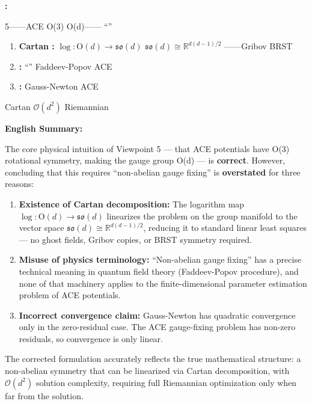 \documentclass[11pt,a4paper]{article}
\theoremstyle{plain}
\theoremstyle{definition}
\theoremstyle{remark}
\newcommand{\R}{\mathbb{R}}
\newcommand{\so}{\mathfrak{so}}
\begin{document}
\noindent
\textbf{:}

5——ACE  O(3)  O(d)——\textbf{}
``''\textbf{}

\begin{enumerate}[label=(\arabic*)]
  \item \textbf{Cartan :}  $\log: \mathrm{O}(d) \to \so(d)$
         $\so(d) \cong \R^{d(d-1)/2}$
        ——Gribov  BRST 
  \item \textbf{:} ``''
        Faddeev-Popov  ACE 
        
  \item \textbf{:} Gauss-Newton 
        ACE 
\end{enumerate}

 Cartan 
 $\mathcal{O}(d^2)$
Riemannian 

\bigskip
\noindent
\textbf{English Summary:}

The core physical intuition of Viewpoint 5 — that ACE potentials have O(3)
rotational symmetry, making the gauge group O(d) — is \textbf{correct}.
However, concluding that this requires ``non-abelian gauge fixing'' is
\textbf{overstated} for three reasons:

\begin{enumerate}[label=(\arabic*)]
  \item \textbf{Existence of Cartan decomposition:} The logarithm map
        $\log: \mathrm{O}(d) \to \so(d)$ linearizes the problem on the
        group manifold to the vector space $\so(d) \cong \R^{d(d-1)/2}$,
        reducing it to standard linear least squares — no ghost fields,
        Gribov copies, or BRST symmetry required.
  \item \textbf{Misuse of physics terminology:} ``Non-abelian gauge fixing''
        has a precise technical meaning in quantum field theory
        (Faddeev-Popov procedure), and none of that machinery applies to
        the finite-dimensional parameter estimation problem of ACE potentials.
  \item \textbf{Incorrect convergence claim:} Gauss-Newton has quadratic
        convergence only in the zero-residual case. The ACE gauge-fixing
        problem has non-zero residuals, so convergence is only linear.
\end{enumerate}

The corrected formulation accurately reflects the true mathematical structure:
a non-abelian symmetry that can be linearized via Cartan decomposition, with
$\mathcal{O}(d^2)$ solution complexity, requiring full Riemannian optimization
only when far from the solution.
\end{document}
